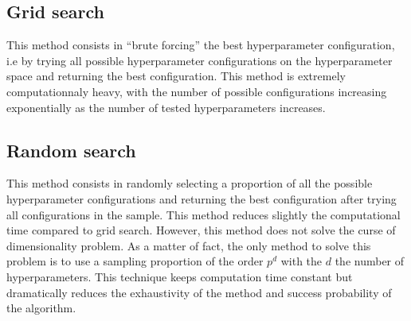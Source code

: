 \documentclass[a4 paper,11pt,2]{article}
\begin{document}
\subsection{Grid search}
This method consists in ``brute forcing'' the best hyperparameter
configuration, i.e by trying all possible hyperparameter configurations on the
hyperparameter space and returning the best configuration. This method is
extremely computationnaly heavy, with the number of possible configurations
increasing exponentially as the number of tested hyperparameters increases.
\begin{algorithm}
    \SetAlgoLined
    \caption{Grid search algorithm}
\end{algorithm}

\subsection{Random search}
This method consists in randomly selecting a proportion of all the possible
hyperparameter configurations and returning the best configuration after trying
all configurations in the sample. This method reduces slightly the
computational time compared to grid search. However, this method does not solve
the curse of dimensionality problem. As a matter of fact, the only method to
solve this problem is to use a sampling proportion of the order $p^d$ with the
$d$ the number of hyperparameters. This technique keeps computation time
constant but dramatically reduces the exhaustivity of the method and success
probability of the algorithm.
\begin{algorithm}
    \SetAlgoLined
    \caption{Random search algorithm}
\end{algorithm}
\end{document}
